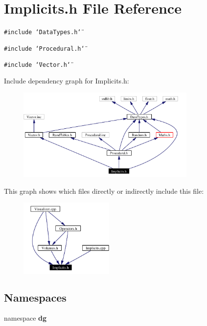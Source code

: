 \section{Implicits.h File Reference}
\label{Implicits_8h}
{\tt \#include \char`\"{}Data\-Types.h\char`\"{}}\par
{\tt \#include \char`\"{}Procedural.h\char`\"{}}\par
{\tt \#include \char`\"{}Vector.h\char`\"{}}\par


Include dependency graph for Implicits.h:\begin{figure}[H]
\begin{center}
\leavevmode
\includegraphics[width=250pt]{Implicits_8h__incl}
\end{center}
\end{figure}


This graph shows which files directly or indirectly include this file:\begin{figure}[H]
\begin{center}
\leavevmode
\includegraphics[width=131pt]{Implicits_8h__dep__incl}
\end{center}
\end{figure}
\subsection*{Namespaces}
\begin{CompactItemize}
\item 
namespace {\bf dg}
\end{CompactItemize}
